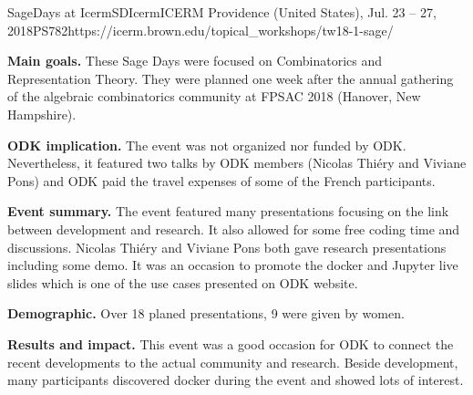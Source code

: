 \begin{event}{SageDays at Icerm}{SDIcerm}{ICERM Providence (United States), Jul. 23 -- 27, 2018}{PS}{78}{2}{https://icerm.brown.edu/topical_workshops/tw18-1-sage/}

\textbf{Main goals.} These Sage Days were focused on Combinatorics and Representation Theory. They were planned one week after the annual gathering of the algebraic combinatorics community at FPSAC 2018 (Hanover, New Hampshire).

\textbf{ODK implication.} The event was not organized nor funded by ODK. Nevertheless, it featured two talks by ODK members (Nicolas Thiéry and Viviane Pons) and ODK paid the travel expenses of some of the French participants.

\textbf{Event summary.} The event featured many presentations focusing on the link between \Sage development and research. It also allowed for some free coding time and discussions. Nicolas Thiéry and Viviane Pons both gave research presentations including some \Sage demo. It was an occasion to promote the \Sage docker and Jupyter live slides which is one of the use cases presented on ODK website. 

\textbf{Demographic.} Over 18 planed presentations, 9 were given by women.

\textbf{Results and impact.} This event was a good occasion for ODK to connect the recent developments to the actual community and research. Beside \Sage development, many participants discovered docker during the event and showed lots of interest.

\end{event}